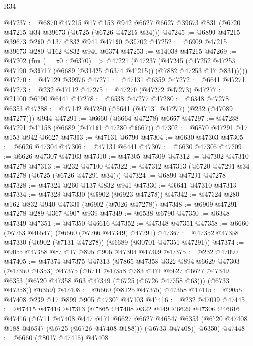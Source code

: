 \begin{lexlean}{R34}
\begin{coremodule}
@47237 := @6870
    @47215
    @17
    @153
    @942
    @6627
    @6627
    @39673
    @831
    (@6720 @47215 @34 @39673 (@6725 (@6726 @47215 @34)))
@47245 := @6890 @47215 @39673 @260 @137 @832 @941 @47190 @39702
@47252 := @6909 @47215 @39673 @280 @162 @832 @940 @6374
@47253 := @14038 @47215
@47269 := @47202
    (fun (__x0 : @6370) =>
    @47221
      (@47237
        (@47245
          (@47252 @47253 @47190 @39717 (@6689 (@31425 @6374 @47215)) (@7882 @47253 @17 @831)))))
@47270 := @47129 @39976
@47271 := @47131 @6359
@47272 := @6641 @47271
@47273 := @232 @47112
@47275 := @47270 (@47272 @47273)
@47277 := @21100 @6790 @6441
@47278 := @6538 @47277
@47280 := @6348 @47278 @6353
@47288 := @47142 @47280 (@6641 (@47131 @47277) (@232 (@47089 @47277))) @944
@47291 := @6660 (@6664 @47278) @6667
@47297 := @47288 @47291 @47158 (@6689 (@47161 @47280 @6667))
@47302 := @6870 @47291 @17 @153 @942 @6627
@47303 := @47131 @6790
@47304 := @6630 @47303
@47305 := @6626 @47304
@47306 := @47131 @6441
@47307 := @6630 @47306
@47309 := @6626 @47307 @47103
@47310 := @47305 @47309
@47312 := @47302 @47310 @47278
@47313 := @232 @47100
@47322 := @47312 @47313 (@6720 @47291 @34 @47278 (@6725 (@6726 @47291 @34)))
@47324 := @6890 @47291 @47278
@47328 := @47324 @260 @137 @832 @941
@47330 := @6641 @47310 @47313
@47334 := @47328 @47330 (@6902 (@6923 @47278))
@47342 := @47324 @280 @162 @832 @940 @47330 (@6902 (@7026 @47278))
@47348 := @6909 @47291 @47278 @289 @367 @907 @939
@47349 := @6538 @6790
@47350 := @6348 @47349
@47351 := @47350 @46616
@47352 := @47348 @47351
@47358 := @6660 (@7763 @46547) (@6660 (@7766 @47349) @47291)
@47367 := @47352 @47358 @47330 (@6902 (@7131 @47278)) (@6689 (@30701 @47351 @47291))
@47374 := @9055 @47358 @87 @17 @895 @906 @47304 @47309
@47375 := @232 @47090
@47405 := @47374
    @47375
    @47313
    (@7865
      @47358
      @322
      @894
      @6629
      @47303
      (@47350 @6353)
      @47375
      (@6711
        @47358
        @383
        @171
        @6627
        @6627
        @47349
        @6353
        (@6720 @47358 @63 @47349 (@6725 (@6726 @47358 @63)))
        (@6733 @47358))
      @6359)
@47408 := @6660 (@8125 @47375) @47358
@47415 := @9055 @47408 @239 @17 @899 @905 @47307 @47103
@47416 := @232 @47099
@47445 := @47415
    @47416
    @47313
    (@7865
      @47408
      @322
      @449
      @6629
      @47306
      @46616
      @47416
      (@6711
        @47408
        @447
        @171
        @6627
        @6627
        @46547
        @6353
        (@6720 @47408 @188 @46547 (@6725 (@6726 @47408 @188)))
        (@6733 @47408))
      @6350)
@47448 := @6660 (@8017 @47416) @47408

\end{coremodule}
\end{lexlean}
